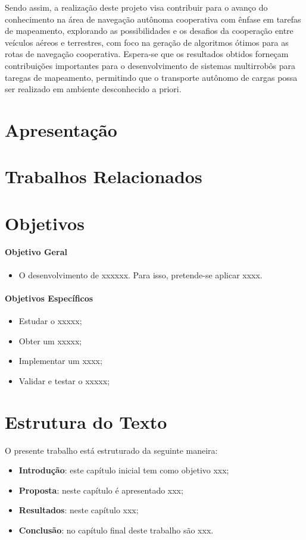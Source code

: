 Sendo assim, a realização deste projeto visa contribuir para o avanço do conhecimento na área de navegação autônoma cooperativa com ênfase em tarefas de mapeamento, explorando as possibilidades e os desafios da cooperação entre veículos aéreos e terrestres, com foco na geração de algoritmos ótimos para as rotas de navegação cooperativa. Espera-se que os resultados obtidos forneçam contribuições importantes para o desenvolvimento de sistemas multirrobôs para taregas de mapeamento, permitindo que o transporte autônomo de cargas possa ser realizado em ambiente desconhecido a priori.

\section{Apresentação}

\section{Trabalhos Relacionados}


\section{Objetivos}

\paragraph*{Objetivo Geral}

\begin{itemize}
\item 
O desenvolvimento de xxxxxx. Para isso, pretende-se aplicar xxxx.
\end{itemize}

\paragraph*{Objetivos Específicos}

\begin{itemize}
\item
Estudar o xxxxx;
\item
Obter um xxxxx;
\item
Implementar um xxxx;
\item
Validar e testar o xxxxx;
\end{itemize}

\section{Estrutura do Texto}
O presente trabalho está estruturado da seguinte maneira:
\begin{itemize}
\item
\textbf{Introdução}: este capítulo inicial tem como objetivo xxx;
\item
\textbf{Proposta}: neste capítulo é apresentado xxx; 
\item
\textbf{Resultados}: neste capítulo xxx; 
\item
\textbf{Conclusão}: no capítulo final deste trabalho são xxx.
\end{itemize}